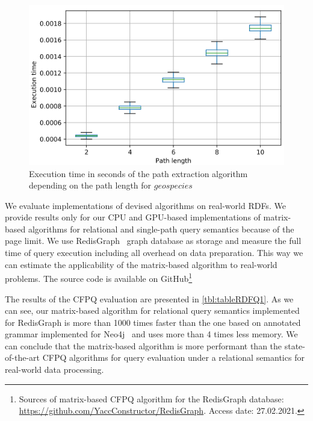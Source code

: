 \documentclass[sigconf, nonacm]{acmart}
\begin{document}
\begin{figure}
	\centering	
	\includegraphics[width=0.62\linewidth]{plots/geo.png}
	\caption{Execution time in seconds of the path extraction algorithm depending on the path length for $geospecies$}
	\label{fig:extractTime}
\end{figure}

We evaluate implementations of devised algorithms on real-world RDFs. We provide results only for our CPU and GPU-based implementations of matrix-based algorithms for relational and single-path query semantics because of the page limit. We use RedisGraph~\cite{8778293} graph database as storage and measure the full time of query execution including all overhead on data preparation. This way we can estimate the applicability of the matrix-based algorithm to real-world problems. The source code is available on GitHub\footnote{Sources of matrix-based CFPQ algorithm for the RedisGraph database: \url{https://github.com/YaccConstructor/RedisGraph}. Access date: 27.02.2021.}


The results of the CFPQ evaluation are presented in \autoref{tbl:tableRDFQ1}. As we can see, our matrix-based algorithm for relational query semantics implemented for RedisGraph is more than 1000 times faster than the one based on annotated grammar implemented for Neo4j~\cite{Kuijpers:2019:ESC:3335783.3335791} and uses more than 4 times less memory.
We can conclude that the matrix-based algorithm is more performant than the state-of-the-art CFPQ algorithms for query evaluation under a relational semantics for real-world data processing.

\end{document}
